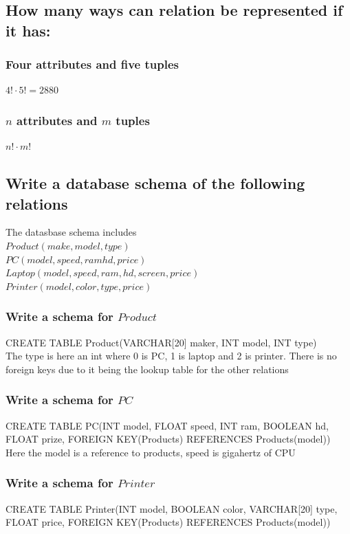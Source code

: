 \documentclass[12pt, a4paper]{article}
\begin{document}
			\subsection{How many ways can relation be represented if it has:}
				\subsubsection{Four attributes and five tuples}
					$4! \cdot 5! = 2880$\\
				\subsubsection{$n$ attributes and $m$ tuples}
					$n! \cdot m!$
			\subsection{Write a database schema of the following relations}
				The datasbase schema includes\\
				$Product(make, model, type)$\\
				$PC(model, speed,ram hd, price)$\\
				$Laptop(model, speed, ram, hd ,screen, price)$\\
				$Printer(model, color, type, price)$
				\subsubsection{Write a schema for $Product$}
					CREATE TABLE Product(VARCHAR[20] maker, INT model, INT type)\\
					The type is here an int where 0 is PC, 1 is laptop and 2 is printer. There is no foreign keys due to it being the lookup table for the other relations
				\subsubsection{Write a schema for $PC$}
					CREATE TABLE PC(INT model, FLOAT speed, INT ram, BOOLEAN hd, FLOAT prize, FOREIGN KEY(Products) REFERENCES Products(model))\\
					Here the model is a reference to products, speed is gigahertz of CPU
				\subsubsection{Write a schema for $Printer$}
					CREATE TABLE Printer(INT model, BOOLEAN color, VARCHAR[20] type, FLOAT price, FOREIGN KEY(Products) REFERENCES Products(model))\\
\end{document}
